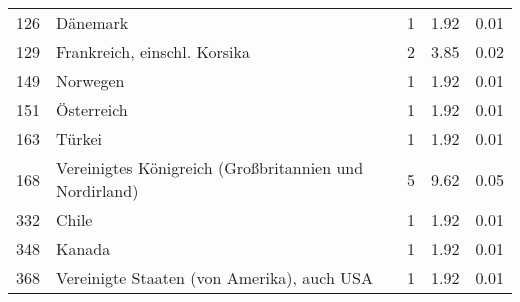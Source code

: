 \begin{longtable}{lXrrr}
        126 & \multicolumn{1}{X}{Dänemark} & %
          \num{1} &
          \num[round-mode=places,round-precision=2]{1.92} &
          \num[round-mode=places,round-precision=2]{0.01} \\

        129 & \multicolumn{1}{X}{Frankreich, einschl. Korsika} & %
          \num{2} &
          \num[round-mode=places,round-precision=2]{3.85} &
          \num[round-mode=places,round-precision=2]{0.02} \\

        149 & \multicolumn{1}{X}{Norwegen} & %
          \num{1} &
          \num[round-mode=places,round-precision=2]{1.92} &
          \num[round-mode=places,round-precision=2]{0.01} \\

        151 & \multicolumn{1}{X}{Österreich} & %
          \num{1} &
          \num[round-mode=places,round-precision=2]{1.92} &
          \num[round-mode=places,round-precision=2]{0.01} \\

        163 & \multicolumn{1}{X}{Türkei} & %
          \num{1} &
          \num[round-mode=places,round-precision=2]{1.92} &
          \num[round-mode=places,round-precision=2]{0.01} \\

        168 & \multicolumn{1}{X}{Vereinigtes Königreich (Großbritannien und Nordirland)} & %
          \num{5} &
          \num[round-mode=places,round-precision=2]{9.62} &
          \num[round-mode=places,round-precision=2]{0.05} \\

        332 & \multicolumn{1}{X}{Chile} & %
          \num{1} &
          \num[round-mode=places,round-precision=2]{1.92} &
          \num[round-mode=places,round-precision=2]{0.01} \\

        348 & \multicolumn{1}{X}{Kanada} & %
          \num{1} &
          \num[round-mode=places,round-precision=2]{1.92} &
          \num[round-mode=places,round-precision=2]{0.01} \\

        368 & \multicolumn{1}{X}{Vereinigte Staaten (von Amerika), auch USA} & %
          \num{1} &
          \num[round-mode=places,round-precision=2]{1.92} &
          \num[round-mode=places,round-precision=2]{0.01} \\


\end{longtable}
